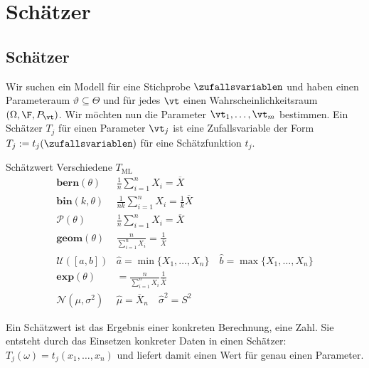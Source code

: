 
\section{Schätzer}
\subsection{Schätzer}
Wir suchen ein Modell für eine Stichprobe $\zufallsvariablen$ und haben einen
Parameteraum $\vartheta \subseteq \varTheta$ und für jedes $\vt$ einen
Wahrscheinlichkeitsraum $ (\Omega, \F, P_\vt)$. Wir möchten nun die Parameter
$\vt_1, \dots, \vt_m$ bestimmen. Ein Schätzer $T_j$ für einen Parameter $\vt_j$
ist eine Zufallsvariable der Form $T_j := t_j (\zufallsvariablen)$ für eine
Schätzfunktion $t_j$.
\begin{definition}{Schätzwert}
  Verschiedene $T_{\text{ML}}$
  \begin{equation*}
    \begin{array}{cc}
      \textbf{bern} (\theta)     & \frac{1}{n} \sum_{i=1}^{n} X_i = \overline{X}                                \\[5pt]
      \textbf{bin} (k,\theta)    & \frac{1}{nk} \sum_{i=1}^{n} X_i = \frac{1}{k} \overline{X}                   \\[5pt]
      \mathcal{P} (\theta)       & \frac{1}{n} \sum_{i=1}^{n} X_i = \overline{X}                                \\[5pt]
      \textbf{geom}(\theta)      & \frac{n}{\sum_{i=1}^{n} X_i} = \frac{1}{\overline{X}}                        \\[10pt]
      \mathcal{U}([a,b])         & \hat{a} = \min\{X_1, \ldots , X_n\} \quad \hat{b}= \max\{X_1, \ldots , X_n\} \\[5pt]
      \textbf{exp}(\theta)       & = \frac{n}{\sum_{i=1}^{n} X_i} \frac{1}{\overline{X}}                        \\[5pt]
      \mathcal{N}(\mu, \sigma^2) & \hat{\mu} = \overline{X}_n \quad \hat{\sigma}^2 = S^2
    \end{array}
  \end{equation*}
\end{definition}

Ein Schätzwert ist das Ergebnis einer konkreten Berechnung, eine Zahl. Sie
entsteht durch das Einsetzen konkreter Daten in einen Schätzer: $T_j (\omega) =
  t_j (x_1, \dots, x_n)$ und liefert damit einen Wert für genau einen Parameter.
